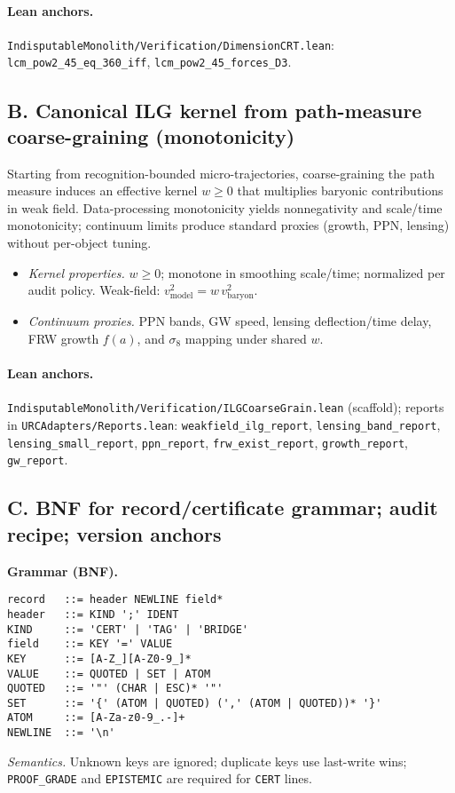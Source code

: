 \documentclass[11pt]{article}
\begin{document}
\paragraph{Lean anchors.} \texttt{IndisputableMonolith/Verification/DimensionCRT.lean}: \texttt{lcm\_pow2\_45\_eq\_360\_iff}, \texttt{lcm\_pow2\_45\_forces\_D3}.

\subsection*{B. Canonical ILG kernel from path\mbox{-}measure coarse\mbox{-}graining (monotonicity)}
Starting from recognition\mbox{-}bounded micro\mbox{-}trajectories, coarse\mbox{-}graining the path measure induces an effective kernel \(w\ge 0\) that multiplies baryonic contributions in weak field. Data\mbox{-}processing monotonicity yields nonnegativity and scale/time monotonicity; continuum limits produce standard proxies (growth, PPN, lensing) without per\mbox{-}object tuning.
\begin{itemize}
  \item \emph{Kernel properties.} \(w\ge 0\); monotone in smoothing scale/time; normalized per audit policy. Weak\mbox{-}field: \(v^2_{\mathrm{model}}=w\,v^2_{\mathrm{baryon}}\).
  \item \emph{Continuum proxies.} PPN bands, GW speed, lensing deflection/time delay, FRW growth \(f(a)\), and \(\sigma_8\) mapping under shared \(w\).
\end{itemize}

\paragraph{Lean anchors.} \texttt{IndisputableMonolith/Verification/ILGCoarseGrain.lean} (scaffold); reports in \texttt{URCAdapters/Reports.lean}: \texttt{weakfield\_ilg\_report}, \texttt{lensing\_band\_report}, \texttt{lensing\_small\_report}, \texttt{ppn\_report}, \texttt{frw\_exist\_report}, \texttt{growth\_report}, \texttt{gw\_report}.

\subsection*{C. BNF for record/certificate grammar; audit recipe; version anchors}
\textbf{Grammar (BNF).}
\begin{verbatim}
record   ::= header NEWLINE field*
header   ::= KIND ';' IDENT
KIND     ::= 'CERT' | 'TAG' | 'BRIDGE'
field    ::= KEY '=' VALUE
KEY      ::= [A-Z_][A-Z0-9_]*
VALUE    ::= QUOTED | SET | ATOM
QUOTED   ::= '"' (CHAR | ESC)* '"'
SET      ::= '{' (ATOM | QUOTED) (',' (ATOM | QUOTED))* '}'
ATOM     ::= [A-Za-z0-9_.-]+
NEWLINE  ::= '\n'
\end{verbatim}
\emph{Semantics.} Unknown keys are ignored; duplicate keys use last\mbox{-}write wins; \texttt{PROOF\_GRADE} and \texttt{EPISTEMIC} are required for \texttt{CERT} lines.
\end{document}
